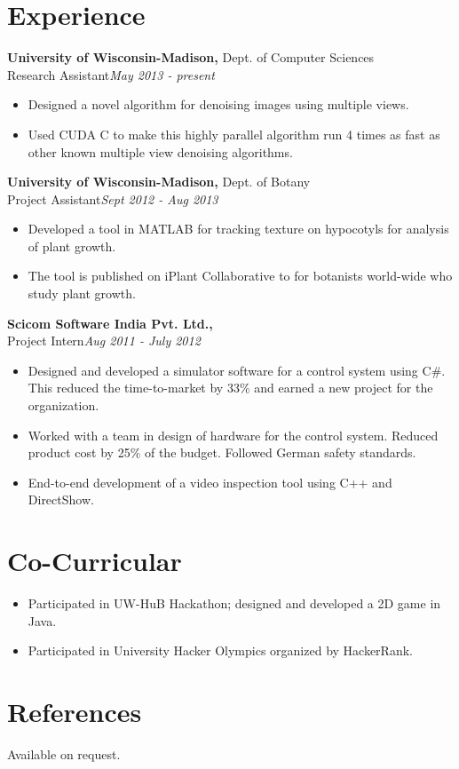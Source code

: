 \documentclass[margin]{res}
\begin{document}
\begin{resume}
\section{Experience}
 {\bf University of Wisconsin-Madison,} Dept. of Computer Sciences \\
Research Assistant\hfill {\it May 2013 - present}
 \begin{itemize} \itemsep -2pt  %
 \item Designed a novel algorithm for denoising images using multiple views.
 \item Used CUDA C to make this highly parallel algorithm run 4 times as fast as other known multiple view denoising algorithms. 
 \end{itemize}

  {\bf University of Wisconsin-Madison,} Dept. of Botany \\
Project Assistant\hfill {\it Sept 2012 - Aug 2013}
 \begin{itemize} \itemsep -2pt  %
 \item Developed a tool in MATLAB for tracking texture on hypocotyls for analysis of plant growth.
 \item The tool is published on iPlant Collaborative to for botanists world-wide who study plant growth.
 \end{itemize}
  {\bf Scicom Software India Pvt. Ltd.,} \\
Project Intern\hfill{\it Aug 2011 - July 2012}
 \begin{itemize} \itemsep -2pt  %
 \item Designed and developed a simulator software for a control system using C\#. This reduced the time-to-market by 33\% and earned a new project for the organization.
 \item Worked with a team in design of hardware for the control system. Reduced product cost by 25\% of the budget. Followed German safety standards. 
 \item End-to-end development of a video inspection tool using C++ and DirectShow.
 \end{itemize}

\section{Co-Curricular}
\begin{itemize} \itemsep -2pt  %
 \item Participated in UW-HuB Hackathon; designed and developed a 2D game in Java.
 \item Participated in University Hacker Olympics organized by HackerRank.
 \end{itemize}

 \section{References}
Available on request.


\end{resume} 
\end{document}
